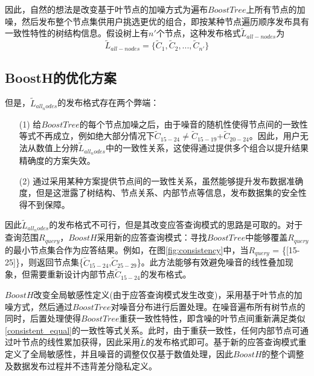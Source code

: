 因此，自然的想法是改变基于叶节点的加噪方式为遍布$BoostTree$上所有节点的加噪，然后发布整个节点集供用户挑选更优的组合，即按某种节点遍历顺序发布具有一致性特性的树结构信息。假设树上有$n'$个节点，这种发布格式$\tilde{L}_{all-nodes}$为
\[
\tilde{L}_{all-nodes} = \{\tilde{C}_{1},\tilde{C}_{2},...,\tilde{C}_{n'}\}
\]

\subsection{BoostH的优化方案}
\label{BoostH}

但是，$\tilde{L}_{all_nodes}$的发布格式存在两个弊端：
\begin{itemize}
	\item[(1)] 给$BoostTree$的每个节点加噪之后，由于噪音的随机性使得节点间的一致性等式不再成立，例如绝大部分情况下{$\tilde{C}_{15-24}$}$ \neq ${$\tilde{C}_{15-19}$}+{$\tilde{C}_{20-24}$}。因此，用户无法从数值上分辨$\tilde{L}_{all_nodes}$中的一致性关系，这使得通过提供多个组合以提升结果精确度的方案失效。
	\item[(2)] 通过采用某种方案提供节点间的一致性关系，虽然能够提升发布数据准确度，但是这泄露了树结构、节点关系、内部节点等信息，发布数据集的安全性得不到保障。
\end{itemize}

因此$\tilde{L}_{all_nodes}$的发布格式不可行，但是其改变应答查询模式的思路是可取的。对于查询范围$R_{query}$，$BoostH$采用新的应答查询模式：寻找$BoostTree$中能够覆盖$R_{query}$的最小节点集合作为应答结果。例如，在图\ref{fig:consistency}中，当$R_{query}$ = \{[15-25]\}，则返回节点集\{$\tilde{C}_{15-24}$,$\tilde{C}_{25-29}$\}。此方法能够有效避免噪音的线性叠加现象，但需要重新设计内部节点$\tilde{C}_{15-24}$的发布格式。

$BoostH$改变全局敏感性定义(由于应答查询模式发生改变)，采用基于叶节点的加噪方式，然后通过$BoostTree$对噪音分布进行后置处理。在噪音遍布所有树节点的同时，后置处理使得$BoostTree$重获一致性特性，即含噪的叶节点间重新满足类似\ref{consistent_equal}的一致性等式关系。此时，由于重获一致性，任何内部节点可通过叶节点的线性累加获得，因此采用$\tilde{L}$的发布格式即可。基于新的应答查询模式重定义了全局敏感性，并且噪音的调整仅仅基于数值处理，因此$BoostH$的整个调整及数据发布过程并不违背差分隐私定义。

